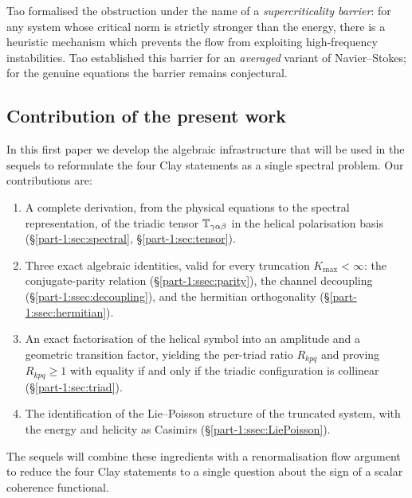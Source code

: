 Tao \cite{Tao2016} formalised the obstruction under the name of a 
\emph{supercriticality barrier}: for any system whose critical norm is 
strictly stronger than the energy, there is a heuristic mechanism which 
prevents the flow from exploiting high-frequency instabilities. Tao 
established this barrier for an \emph{averaged} variant of 
Navier--Stokes; for the genuine equations the barrier remains conjectural.

\subsection{Contribution of the present work}
\label{part-1:ssec:contribution}

In this first paper we develop the algebraic infrastructure that will be 
used in the sequels to reformulate the four Clay statements as a single 
spectral problem. Our contributions are:

\begin{enumerate}[label=(\alph*),leftmargin=*]
\item A complete derivation, from the physical equations to the 
      spectral representation, of the triadic tensor $\mathbb{T}_{\gamma\alpha\beta}$ 
      in the helical polarisation basis (\S\ref{part-1:sec:spectral}, 
      \S\ref{part-1:sec:tensor}).

\item Three exact algebraic identities, valid for every truncation 
      $K_{\max}<\infty$: the conjugate-parity relation 
      (\S\ref{part-1:ssec:parity}), the channel decoupling 
      (\S\ref{part-1:ssec:decoupling}), and the hermitian orthogonality 
      (\S\ref{part-1:ssec:hermitian}).

\item An exact factorisation of the helical symbol into an amplitude 
      and a geometric transition factor, yielding the per-triad ratio 
      $R_{kpq}$ and proving $R_{kpq}\geq 1$ with equality if and only 
      if the triadic configuration is collinear (\S\ref{part-1:sec:triad}).

\item The identification of the Lie--Poisson structure of the truncated 
      system, with the energy and helicity as Casimirs 
      (\S\ref{part-1:ssec:LiePoisson}).
\end{enumerate}

The sequels will combine these ingredients with a renormalisation flow 
argument to reduce the four Clay statements to a single question about 
the sign of a scalar coherence functional.

